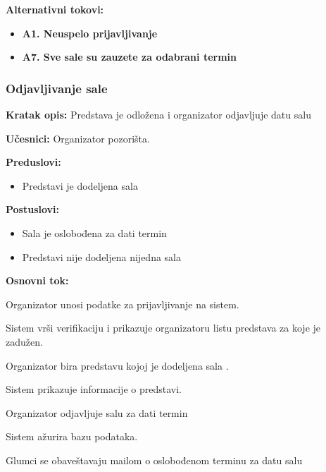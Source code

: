 \documentclass[a4paper]{article}
\begin{document}
\noindent\textbf{Alternativni tokovi:} 
\begin{itemize}
 \item \textbf{A1. Neuspelo prijavljivanje} 
  \item \textbf{A7. Sve sale su zauzete za odabrani termin} 
\end{itemize}
\subsubsection{Odjavljivanje sale}
\noindent\textbf{Kratak opis:} Predstava je odložena i organizator odjavljuje datu salu

\noindent\textbf{Učesnici:} Organizator pozorišta.

\noindent\textbf{Preduslovi:}
  \begin{itemize}
    \item Predstavi je dodeljena sala
  \end{itemize}

\noindent\textbf{Postuslovi:} 
  \begin{itemize}
    \item Sala je oslobođena za dati termin
    \item Predstavi nije dodeljena nijedna sala
  \end{itemize}

\noindent\textbf{Osnovni tok:}
  \begin{legal}
  \item Organizator unosi podatke za prijavljivanje na sistem.
    \item Sistem vrši verifikaciju i prikazuje organizatoru listu predstava za koje je zadužen.
    \item Organizator bira predstavu kojoj je dodeljena sala .
    \item Sistem prikazuje informacije o predstavi.
    \item Organizator odjavljuje salu za dati termin
    \item Sistem ažurira bazu podataka.
    \item Glumci se obaveštavaju mailom o oslobođenom terminu za datu salu
  \end{legal}
\end{document}
